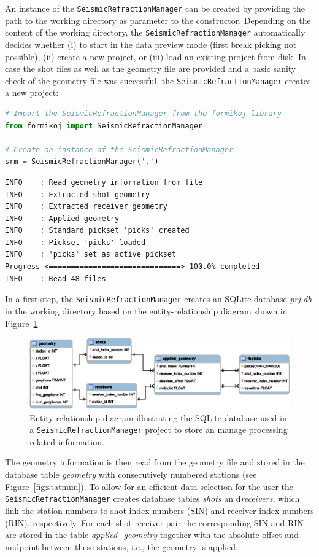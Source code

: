 \documentclass[a4paper,fleqn]{cas-sc}
\begin{document}
An instance of the \texttt{SeismicRefractionManager} can be created by providing the path to the working directory as parameter to the constructor. Depending on the content of the working directory, the \texttt{SeismicRefractionManager} automatically decides whether (i) to start in the data preview mode (first break picking not possible), (ii) create a new project, or (iii) load an existing project from disk.
In case the shot files as well as the geometry file are provided and a basic sanity check of the geometry file was successful, the \texttt{SeismicRefractionManager} creates a new project:
\begin{lstlisting}[language=Python, firstnumber=1]
# Import the SeismicRefractionManager from the formikoj library
from formikoj import SeismicRefractionManager

# Create an instance of the SeismicRefractionManager
srm = SeismicRefractionManager('.')
\end{lstlisting}
\begin{footnotesize}
\begin{verbatim}
INFO    : Read geometry information from file
INFO    : Extracted shot geometry
INFO    : Extracted receiver geometry
INFO    : Applied geometry
INFO    : Standard pickset 'picks' created
INFO    : Pickset 'picks' loaded
INFO    : 'picks' set as active pickset
Progress <==============================> 100.0% completed
INFO    : Read 48 files
\end{verbatim}
\end{footnotesize}
In a first step, the \texttt{SeismicRefractionManager} creates an SQLite database \textit{prj.db} in the working directory based on the entity-relationship diagram shown in Figure~\ref{fig:database}.
\begin{figure}
	\centering
	\includegraphics[width=.75\textwidth]{figures/srm_erd.eps}
	\caption{Entity-relationship diagram illustrating the SQLite database used in a \texttt{SeismicRefractionManager} project to store an manage processing related information.}
	\label{fig:database}
\end{figure}
The geometry information is then read from the geometry file and stored in the database table \textit{geometry} with consecutively numbered stations (see Figure~\ref{fig:statnum}). To allow for an efficient data selection for the user the \texttt{SeismicRefractionManager} creates database tables \textit{shots} an d\textit{receivers}, which link the station numbers to shot index numbers (SIN) and receiver index numbers (RIN), respectively. For each shot-receiver pair the corresponding SIN and RIN are stored in the table \textit{applied\_geometry} together with the absolute offset and midpoint between these stations, i.e., the geometry is applied.
\end{document}
